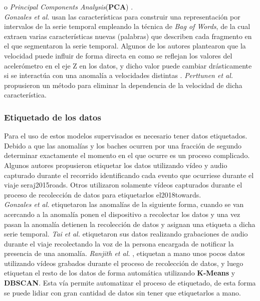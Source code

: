 			o \emph{Principal Components Analysis}(\textbf{PCA}) .\\
			\indent \emph{Gonzales et al.}  usan las características para construir una representación por intervalos de la serie
			temporal empleando la técnica de \emph{Bag of Words}, de la cual extraen varias características nuevas (palabras) que describen cada fragmento
			en el que segmentaron la serie temporal. Algunos de los autores plantearon que la velocidad puede influir de forma directa en como se reflejan
			los valores del acelerómetro en el eje Z en los datos, y dicho valor puede cambiar drásticamente si se interactúa con una anomalía a velocidades
			distintas . \emph{Perttunen et al.} 
			propusieron un método para eliminar la dependencia de la velocidad de dicha característica. 

		\subsubsection{Etiquetado de los datos}
			Para el uso de estos modelos supervisados es necesario tener datos etiquetados. Debido a que las anomalías y los baches ocurren por una 
			fracción de segundo determinar exactamente el momento en el que ocurre es un proceso complicado. Algunos autores propusieron etiquetar
			los datos utilizando vídeo y audio capturado durante el recorrido identificando cada evento que ocurriese durante el viaje \brackcite
			{seraj2015roads}. Otros utilizaron solamente vídeos capturados durante el proceso de recolección de datos para etiquetarlos \brackcite
			{el2018towards}.\\
			\indent \emph{Gonzales et al.}  etiquetaron las anomalías de la siguiente forma, cuando se van acercando a la
			anomalía ponen el dispositivo a recolectar los datos y una vez pasan la anomalía detienen la recolección de datos y asignan una etiqueta
			a dicha serie temporal. \emph{Tai et al.}  etiquetaron sus datos realizando grabaciones de audio durante el
			viaje recolectando la voz de la persona encargada de notificar la presencia de una anomalía.
			\indent \emph{Ranjith et al.} , etiquetan a mano unos pocos datos utilizando vídeos grabados durante el proceso
			de recolección de datos, y luego etiquetan el resto de los datos de forma automática utilizando \textbf{K-Means} y \textbf{DBSCAN}. Esta vía 
			permite automatizar el proceso de etiquetado, de esta forma se puede lidiar con gran cantidad de datos sin tener que etiquetarlos a mano.



